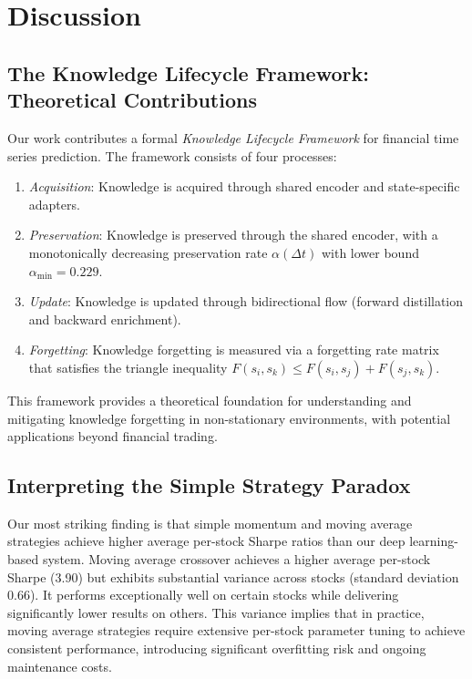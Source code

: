 \documentclass[review]{elsarticle}
\begin{document}
\section{Discussion}

\subsection{The Knowledge Lifecycle Framework: Theoretical Contributions}

Our work contributes a formal \textit{Knowledge Lifecycle Framework} for financial time series prediction. The framework consists of four processes:

\begin{enumerate}
\item \textit{Acquisition}: Knowledge is acquired through shared encoder and state-specific adapters.
\item \textit{Preservation}: Knowledge is preserved through the shared encoder, with a monotonically decreasing preservation rate $\alpha(\Delta t)$ with lower bound $\alpha_{\min} = 0.229$.
\item \textit{Update}: Knowledge is updated through bidirectional flow (forward distillation and backward enrichment).
\item \textit{Forgetting}: Knowledge forgetting is measured via a forgetting rate matrix that satisfies the triangle inequality $F(s_i, s_k) \leq F(s_i, s_j) + F(s_j, s_k)$.
\end{enumerate}

This framework provides a theoretical foundation for understanding and mitigating knowledge forgetting in non-stationary environments, with potential applications beyond financial trading.

\subsection{Interpreting the Simple Strategy Paradox}

Our most striking finding is that simple momentum and moving average strategies achieve higher average per-stock Sharpe ratios than our deep learning-based system. Moving average crossover achieves a higher average per-stock Sharpe (3.90) but exhibits substantial variance across stocks (standard deviation 0.66). It performs exceptionally well on certain stocks while delivering significantly lower results on others. This variance implies that in practice, moving average strategies require extensive per-stock parameter tuning to achieve consistent performance, introducing significant overfitting risk and ongoing maintenance costs.
\end{document}

